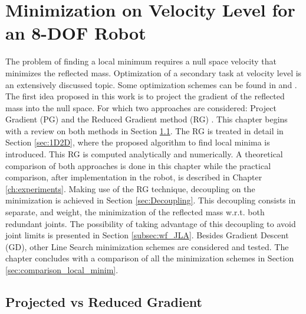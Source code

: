 \chapter{Minimization on Velocity Level for an 8-DOF Robot}
\label{ch:velocity}

The problem of finding a local minimum requires a null space velocity that minimizes the reflected mass.
Optimization of a secondary task at velocity level is an extensively discussed topic. Some optimization schemes can be found in \cite{opt_vel_level_1} and \cite{opt_vel_level_2}.  The first idea proposed in this work is to project the gradient of the reflected mass into the null space. For which two approaches are considered: Project Gradient (PG) \cite{JLA_1} and the Reduced Gradient method (RG) \cite{PG_RG}. This chapter begins with a review on both methods in Section \ref{sec:PGvsRG}.
 The RG is treated in detail in Section \ref{sec:1D2D}, where the proposed algorithm to find local minima is introduced. This RG is computed analytically and numerically.  
 A theoretical comparison of both approaches is done in this chapter while the practical comparison, after implementation in the robot, is described in  Chapter \ref{ch:experiments}. Making use of the RG technique, decoupling on the minimization is achieved in Section \ref{sec:Decoupling}. This decoupling consists in separate, and weight, the minimization of the reflected mass w.r.t. both redundant joints. The possibility of taking advantage of this decoupling to avoid joint limits is presented in Section \ref{subsec:wf_JLA}.
Besides Gradient Descent (GD),  other Line Search minimization schemes are considered and tested. The chapter concludes with a comparison of all the minimization schemes in  Section \ref{sec:comparison_local_minim}.
 
 


\section{Projected vs Reduced Gradient}
\label{sec:PGvsRG}

